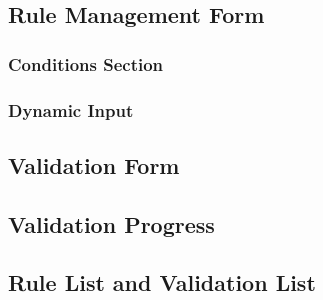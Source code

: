   \subsection{Rule Management Form}

    \subsubsection{Conditions Section}

    \subsubsection{Dynamic Input}

  \subsection{Validation Form}

  \subsection{Validation Progress}
  
  \subsection{Rule List and Validation List}